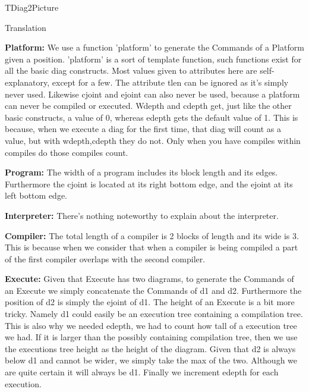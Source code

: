 \documentclass{article}
\begin{document}
\begin{subsection}{TDiag2Picture}
\begin{subsubsection}{Translation}
\hfill \break

\textbf{Platform:} We use a function 'platform' to generate the Commands of a Platform given a position. 'platform' is a sort of template function, such functions exist for all the basic diag constructs. Most values given to attributes here are self-explanatory, except for a few. The attribute tlen can be ignored as it's simply never used. Likewise cjoint and ejoint can also never be used, because a platform can never be compiled or executed. Wdepth and cdepth get, just like the other basic constructs, a value of 0, whereas edepth gets the default value of 1. This is because, when we execute a diag for the first time, that diag will count as a value, but with wdepth,cdepth they do not. Only when you have compiles within compiles do those compiles count.

\hfill \break

\textbf{Program:} The width of a program includes its block length and its edges. Furthermore the cjoint is located at its right bottom edge, and the ejoint at its left bottom edge.

\hfill \break

\textbf{Interpreter:} There's nothing noteworthy to explain about the interpreter.

\hfill \break

\textbf{Compiler:} The total length of a compiler is 2 blocks of length and its wide is 3. This is because when we consider that when a compiler is being compiled a part of the first compiler overlaps with the second compiler.

\hfill \break

\textbf{Execute:} Given that Execute has two diagrams, to generate the Commands of an Execute we simply concatenate the Commands of d1 and d2. Furthermore the position of d2 is simply the ejoint of d1. The height of an Execute is a bit more tricky. Namely d1 could easily be an execution tree containing a compilation tree. This is also why we needed edepth, we had to count how tall of a execution tree we had. If it is larger than the possibly containing compilation tree, then we use the executions tree height as the height of the diagram. Given that d2 is always below d1 and cannot be wider, we simply take the max of the two. Although we are quite certain it will always be d1. Finally we increment edepth for each execution.

\hfill \break


\end{subsubsection}
\end{subsection}
\end{document}
